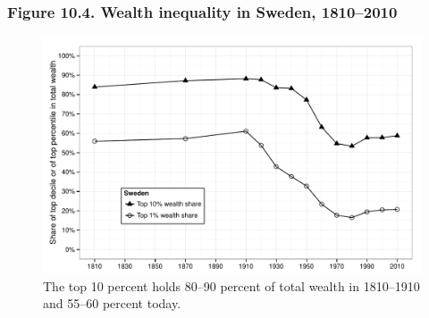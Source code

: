 \documentclass[t]{beamer}\usepackage[]{graphicx}\usepackage[]{color}
\newenvironment{knitrout}{}{} %
\begin{document}
\begin{frame}[label=Figure_10_4]
\frametitle{Figure 10.4. Wealth inequality in Sweden, 1810--2010}
\begin{figure}[t]
\begin{minipage}[b]{\textwidth}
\centering
\begin{knitrout}\footnotesize
{}\color{fgcolor}

{\centering \includegraphics[width=1\linewidth]{figures/bw/Figure_10_4} 

}



\end{knitrout}
\caption{The top 10 percent holds 80--90 percent of total wealth in 1810--1910 and 55--60 percent today.}
\end{minipage}
\end{figure}
\end{frame}
\end{document}
